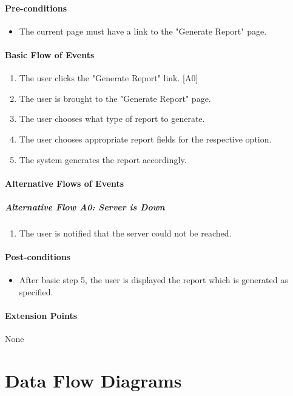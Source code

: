 \documentclass{article}
\begin{document}
\paragraph{Pre-conditions}
\begin{itemize}
\item The current page must have a link to the "Generate Report" page.
\end{itemize}

\paragraph{Basic Flow of Events}
\begin{enumerate}
\item The user clicks the "Generate Report" link. [A0]
\item The user is brought to the "Generate Report" page.
\item The user chooses what type of report to generate.
\item The user chooses appropriate report fields for the respective option.
\item The system generates the report accordingly.
\end{enumerate}

\paragraph{Alternative Flows of Events}

\subparagraph{Alternative Flow A0: Server is Down}
\begin{enumerate}
\item The user is notified that the server could not be reached.
\end{enumerate}

\paragraph{Post-conditions}
\begin{itemize}
\item After basic step 5, the user is displayed the report which is generated as specified.
\end{itemize}

\paragraph{Extension Points}
None


\section{Data Flow Diagrams}
\label{dfd}
\end{document}
